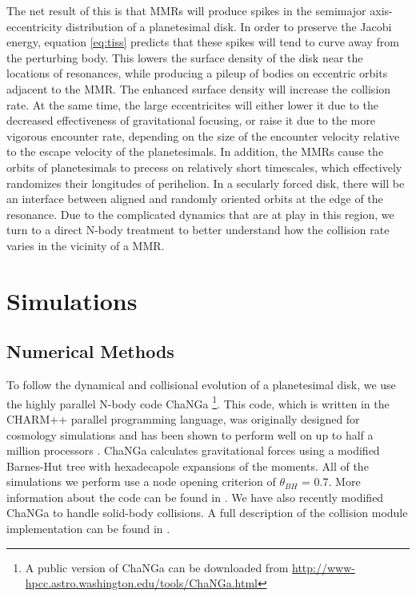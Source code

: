 \documentclass[twocolumn]{aastex63}
\begin{document}
The net result of this is that MMRs will produce spikes in the semimajor axis-eccentricity distribution of a planetesimal disk. In order to 
preserve the Jacobi energy, equation \ref{eq:tiss} predicts that these spikes will tend to curve away from the perturbing body. This lowers the 
surface density of the disk near the locations of resonances, while producing a pileup of bodies on eccentric orbits adjacent to the MMR. The 
enhanced surface density will increase the collision rate. At the same time, the large eccentricites will either lower it due to the decreased 
effectiveness of gravitational focusing, or raise it due to the more vigorous encounter rate, depending on the size of the encounter velocity relative to 
the escape velocity of the planetesimals. In addition, the MMRs cause the orbits of planetesimals to precess on relatively short 
timescales, which effectively randomizes their longitudes of perihelion. In a secularly forced disk, there will be an interface between aligned 
and randomly oriented orbits at the edge of the resonance. Due to the complicated dynamics that are at play in this region, we turn to a direct 
N-body treatment to better understand how the collision rate varies in the vicinity of a MMR.

\section{Simulations} \label{sec:sims}

\subsection{Numerical Methods}\label{sec:methods}

To follow the dynamical and collisional evolution of a planetesimal disk, we use the highly parallel N-body code {\sc ChaNGa} 
\footnote{A public version of {\sc ChaNGa} can be downloaded from \url{http://www-hpcc.astro.washington.edu/tools/ChaNGa.html}}. 
This code, which is written in the {\sc CHARM++} parallel programming language, was originally designed for cosmology simulations 
and has been shown to perform well on up to half a million processors \citep{2015AphCom..2..1}. {\sc ChaNGa} calculates 
gravitational forces using a modified Barnes-Hut \citep{1986Natur.324..446B} tree with hexadecapole expansions of the moments. 
All of the simulations we perform use a node opening criterion of $\theta_{BH}$ = 0.7. More information about the code can be found 
in \citet{2008IEEEpds...ChaNGa}. We have also recently modified {\sc ChaNGa} to handle solid-body collisions. A full description of 
the collision module implementation can be found in \citet{2019MNRAS.489.2159W}.
\end{document}
